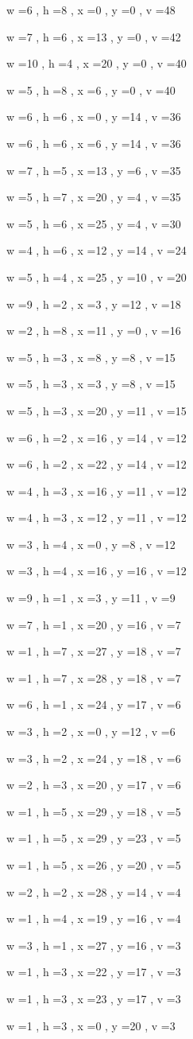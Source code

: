 \documentclass[11pt]{article}
\begin{document}
w =6 , h =8 , x =0 , y =0 , v =48
\par
w =7 , h =6 , x =13 , y =0 , v =42
\par
w =10 , h =4 , x =20 , y =0 , v =40
\par
w =5 , h =8 , x =6 , y =0 , v =40
\par
w =6 , h =6 , x =0 , y =14 , v =36
\par
w =6 , h =6 , x =6 , y =14 , v =36
\par
w =7 , h =5 , x =13 , y =6 , v =35
\par
w =5 , h =7 , x =20 , y =4 , v =35
\par
w =5 , h =6 , x =25 , y =4 , v =30
\par
w =4 , h =6 , x =12 , y =14 , v =24
\par
w =5 , h =4 , x =25 , y =10 , v =20
\par
w =9 , h =2 , x =3 , y =12 , v =18
\par
w =2 , h =8 , x =11 , y =0 , v =16
\par
w =5 , h =3 , x =8 , y =8 , v =15
\par
w =5 , h =3 , x =3 , y =8 , v =15
\par
w =5 , h =3 , x =20 , y =11 , v =15
\par
w =6 , h =2 , x =16 , y =14 , v =12
\par
w =6 , h =2 , x =22 , y =14 , v =12
\par
w =4 , h =3 , x =16 , y =11 , v =12
\par
w =4 , h =3 , x =12 , y =11 , v =12
\par
w =3 , h =4 , x =0 , y =8 , v =12
\par
w =3 , h =4 , x =16 , y =16 , v =12
\par
w =9 , h =1 , x =3 , y =11 , v =9
\par
w =7 , h =1 , x =20 , y =16 , v =7
\par
w =1 , h =7 , x =27 , y =18 , v =7
\par
w =1 , h =7 , x =28 , y =18 , v =7
\par
w =6 , h =1 , x =24 , y =17 , v =6
\par
w =3 , h =2 , x =0 , y =12 , v =6
\par
w =3 , h =2 , x =24 , y =18 , v =6
\par
w =2 , h =3 , x =20 , y =17 , v =6
\par
w =1 , h =5 , x =29 , y =18 , v =5
\par
w =1 , h =5 , x =29 , y =23 , v =5
\par
w =1 , h =5 , x =26 , y =20 , v =5
\par
w =2 , h =2 , x =28 , y =14 , v =4
\par
w =1 , h =4 , x =19 , y =16 , v =4
\par
w =3 , h =1 , x =27 , y =16 , v =3
\par
w =1 , h =3 , x =22 , y =17 , v =3
\par
w =1 , h =3 , x =23 , y =17 , v =3
\par
w =1 , h =3 , x =0 , y =20 , v =3
\par
\newpage
\end{document}
